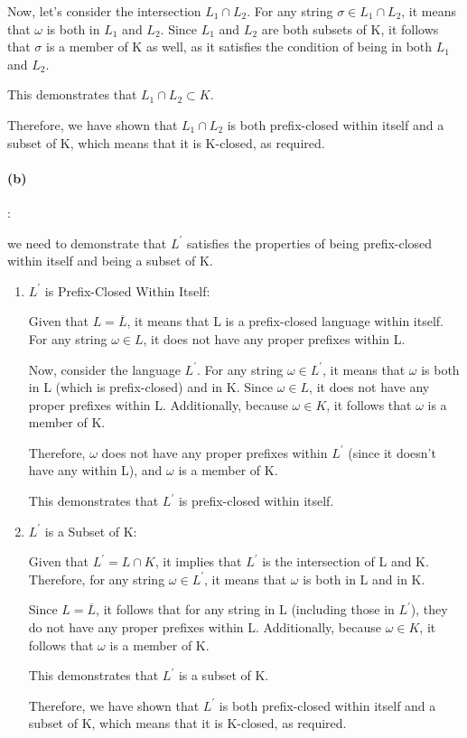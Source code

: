 \documentclass{article}
\begin{document}
Now, let's consider the intersection $L_1 \cap L_2$. For any string $\sigma \in L_1 \cap L_2$, it means that $\omega$ is both in $L_1$ and $L_2$. Since $L_1$ and $L_2$ are both subsets of K, it follows that $\sigma$ is a member of K as well, as it satisfies the condition of being in both $L_1$ and $L_2$.

This demonstrates that $L_1 \cap L_2 \subset K$.

Therefore, we have shown that $L_1 \cap L_2$ is both prefix-closed within itself and a subset of K, which means that it is K-closed, as required.

\paragraph{(b)}:

we need to demonstrate that $L^\prime$ satisfies the properties of being prefix-closed within itself and being a subset of K.

\begin{enumerate}
  \item $L^\prime$ is Prefix-Closed Within Itself:
  
  Given that $L = \overline{L}$, it means that L is a prefix-closed language within itself. For any string $\omega \in L$, it does not have any proper prefixes within L.

  Now, consider the language $L^\prime$. For any string $\omega \in L^\prime$, it means that $\omega$ is both in L (which is prefix-closed) and in K. Since $\omega  \in L$, it does not have any proper prefixes within L. Additionally, because $\omega \in K$, it follows that $\omega$ is a member of K.
  
  Therefore, $\omega$ does not have any proper prefixes within $L^\prime$ (since it doesn't have any within L), and $\omega$ is a member of K.
  
  This demonstrates that $L^\prime$ is prefix-closed within itself.

  \item $L^\prime$ is a Subset of K:
  
  Given that $L^\prime = L \cap K$, it implies that $L^\prime$ is the intersection of L and K. Therefore, for any string $\omega \in L^\prime$, it means that $\omega$ is both in L and in K.

  Since $L = \overline{L}$, it follows that for any string in L (including those in $L^\prime$), they do not have any proper prefixes within L. Additionally, because $\omega \in K$, it follows that $\omega$ is a member of K.

  This demonstrates that $L^\prime$ is a subset of K.

  Therefore, we have shown that $L^\prime$ is both prefix-closed within itself and a subset of K, which means that it is K-closed, as required.

\end{enumerate}
\end{document}
